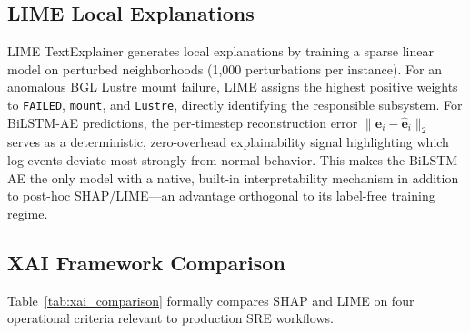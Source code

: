 \documentclass{elektr}
\begin{document}
\subsection{LIME Local Explanations}

LIME TextExplainer generates local explanations by training a sparse linear model
on perturbed neighborhoods (1,000 perturbations per instance). For an anomalous
BGL Lustre mount failure, LIME assigns the highest positive weights to
\texttt{FAILED}, \texttt{mount}, and \texttt{Lustre},
directly identifying the responsible subsystem. For BiLSTM-AE predictions, the
per-timestep reconstruction error $\|\mathbf{e}_i-\hat{\mathbf{e}}_i\|_2$ serves
as a deterministic, zero-overhead explainability signal highlighting which log
events deviate most strongly from normal behavior. This makes the BiLSTM-AE the
only model with a native, built-in interpretability mechanism in addition to
post-hoc SHAP/LIME---an advantage orthogonal to its label-free training regime.

\subsection{XAI Framework Comparison}

Table~\ref{tab:xai_comparison} formally compares SHAP and LIME on four operational
criteria relevant to production SRE workflows.

\begin{table}[h!]
\caption{Comparison of SHAP and LIME in the context of log anomaly detection.}
\begin{center}
\label{tab:xai_comparison}
\end{center}\vs{-4mm}
\end{table}
\end{document}
